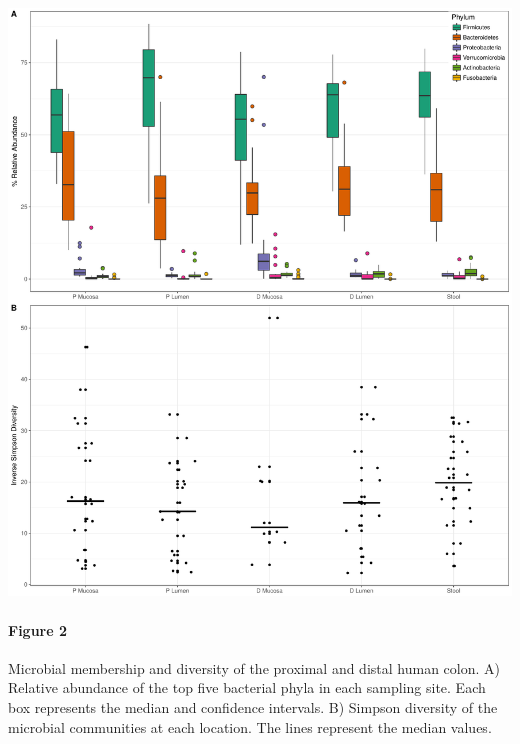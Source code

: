\documentclass[11pt,]{article}
\let\oldparagraph\paragraph
\renewcommand{\paragraph}[1]{\oldparagraph{#1}\mbox{}}
\begin{document}
\includegraphics{../submission/figure_2.pdf}

\paragraph{Figure 2}\label{figure-2}

Microbial membership and diversity of the proximal and distal human
colon. A) Relative abundance of the top five bacterial phyla in each
sampling site. Each box represents the median and confidence intervals.
B) Simpson diversity of the microbial communities at each location. The
lines represent the median values.

\newpage
\end{document}
